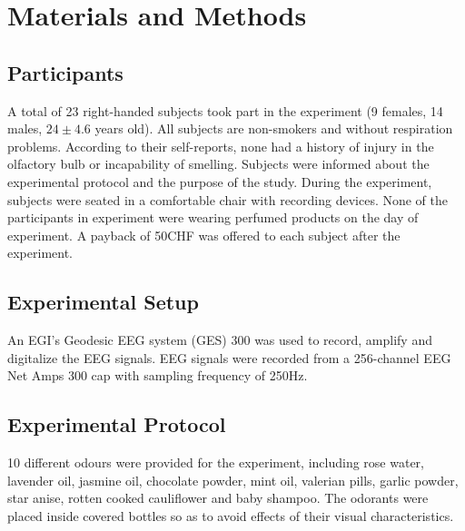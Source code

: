 \documentclass[conference]{IEEEtran}
\begin{document}
\section{Materials and Methods}

\subsection{Participants}
A total of 23 right-handed subjects took part in the experiment (9 females, 14 males, $24 \pm 4.6$ years old). All subjects are non-smokers and without respiration problems. According to their self-reports, none had a history of injury in the olfactory bulb or incapability of smelling. Subjects were informed about the experimental protocol and the purpose of the study. During the experiment, subjects were seated in a comfortable chair with recording devices. None of the participants in experiment were wearing perfumed products on the day of experiment. A payback of 50CHF was offered to each subject after the experiment. 

\subsection{Experimental Setup}
An EGI's Geodesic EEG system (GES) 300 was used to record, amplify and digitalize the EEG signals. EEG signals were recorded from a 256-channel EEG Net Amps 300 cap with sampling frequency of 250Hz.  
\subsection{Experimental Protocol}
10 different odours were provided for the experiment, including rose water, lavender oil, jasmine oil, chocolate powder, mint oil, valerian pills, garlic powder, star anise, rotten cooked cauliflower and baby shampoo. The odorants were placed inside covered bottles so as to avoid effects of their visual characteristics.  
\end{document}
